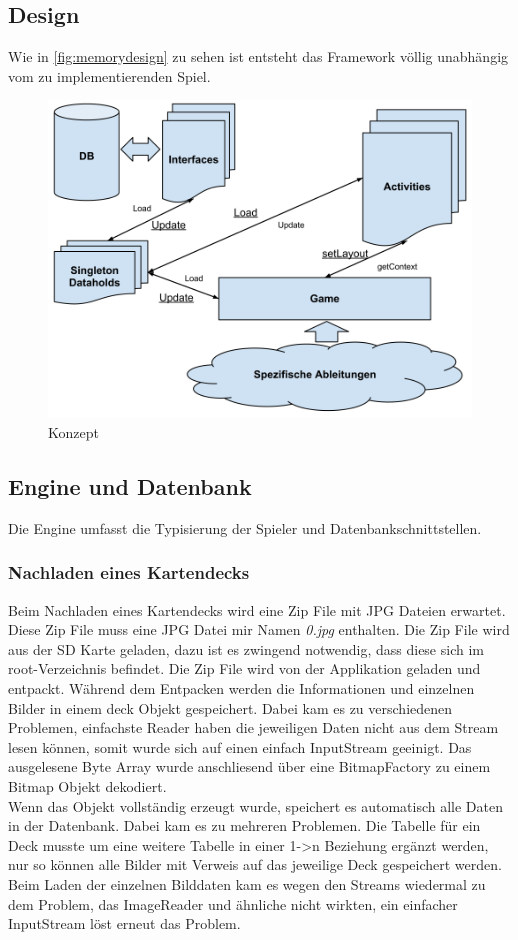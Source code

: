 \documentclass[11pt,a4paper]{article}
\begin{document}
\subsection{Design}
Wie in \autoref{fig:memorydesign} zu sehen ist entsteht das Framework völlig unabhängig vom zu implementierenden Spiel.
\begin{figure}[!h]
\centering
\includegraphics[scale=0.4]{pics/memorydesign.png}
\caption{Konzept}
\label{fig:memorydesign}
\end{figure}

\subsection{Engine und Datenbank}
Die Engine umfasst die Typisierung der Spieler und Datenbankschnittstellen.
\subsubsection{Nachladen eines Kartendecks}
Beim Nachladen eines Kartendecks wird eine Zip File mit JPG Dateien erwartet. Diese Zip File muss eine JPG Datei mir Namen {\em 0.jpg} enthalten. Die Zip File wird aus der SD Karte geladen, dazu ist es zwingend notwendig, dass diese sich im root-Verzeichnis befindet.
Die Zip File wird von der Applikation geladen und entpackt. Während dem Entpacken werden die Informationen und einzelnen Bilder in einem deck Objekt gespeichert. Dabei kam es zu verschiedenen Problemen, einfachste Reader haben die jeweiligen Daten nicht aus dem Stream lesen können, somit wurde sich auf einen einfach InputStream geeinigt. Das ausgelesene Byte Array wurde anschliesend über eine BitmapFactory zu einem Bitmap Objekt dekodiert.\\
Wenn das Objekt vollständig erzeugt wurde, speichert es automatisch alle Daten in der Datenbank. Dabei kam es zu mehreren Problemen. Die Tabelle für ein Deck musste um eine weitere Tabelle in einer 1->n Beziehung ergänzt werden, nur so können alle Bilder mit Verweis auf das jeweilige Deck gespeichert werden.\\
Beim Laden der einzelnen Bilddaten kam es wegen den Streams wiedermal zu dem Problem, das ImageReader und ähnliche nicht wirkten, ein einfacher InputStream löst erneut das Problem.
\end{document}
